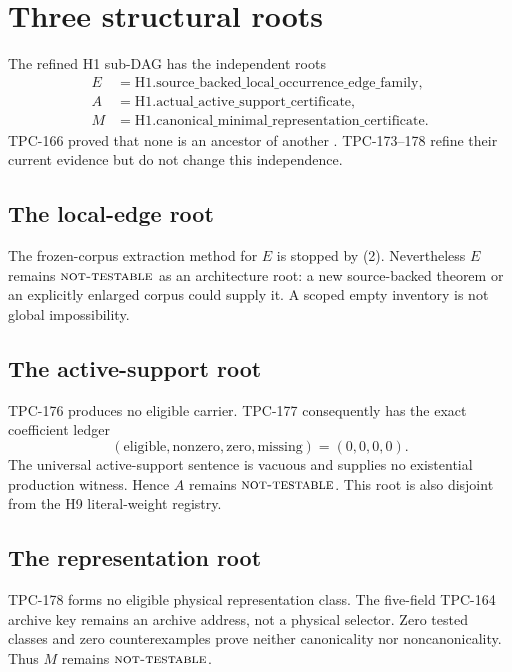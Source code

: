 \documentclass[11pt]{article}
\theoremstyle{definition}
\theoremstyle{remark}
\newcommand{\NT}{\textnormal{\textsc{not-testable}}}
\begin{document}
\section{Three structural roots}

The refined H1 sub-DAG has the independent roots
\[
\begin{aligned}
 E&=\mathrm{H1.source\_backed\_local\_occurrence\_edge\_family},\\
 A&=\mathrm{H1.actual\_active\_support\_certificate},\\
 M&=\mathrm{H1.canonical\_minimal\_representation\_certificate}.
\end{aligned}                                                     \tag{4}
\]
TPC-166 proved that none is an ancestor of another
\cite{WangTPC166}.  TPC-173--178 refine their current evidence but do
not change this independence.

\subsection{The local-edge root}

The frozen-corpus extraction method for \(E\) is stopped by (2).
Nevertheless \(E\) remains \(\NT\) as an architecture root: a new
source-backed theorem or an explicitly enlarged corpus could supply
it.  A scoped empty inventory is not global impossibility.

\subsection{The active-support root}

TPC-176 produces no eligible carrier.  TPC-177 consequently has the
exact coefficient ledger
\[
 (\text{eligible},\text{nonzero},\text{zero},\text{missing})
 =(0,0,0,0).                                                      \tag{5}
\]
The universal active-support sentence is vacuous and supplies no
existential production witness.  Hence \(A\) remains \(\NT\).  This
root is also disjoint from the H9 literal-weight registry.

\subsection{The representation root}

TPC-178 forms no eligible physical representation class.  The
five-field TPC-164 archive key remains an archive address, not a
physical selector.  Zero tested classes and zero counterexamples
prove neither canonicality nor noncanonicality.  Thus \(M\) remains
\(\NT\).
\end{document}
